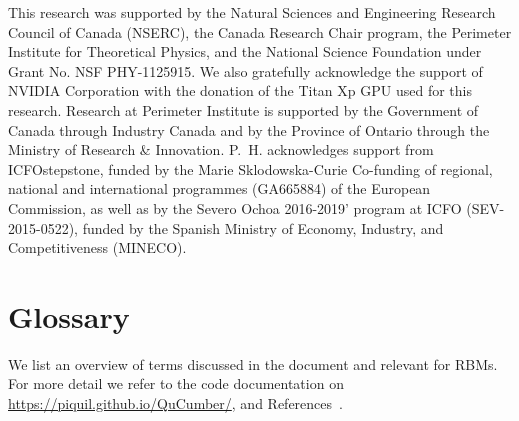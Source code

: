 \documentclass[submission, Phys, hidelnks]{SciPost}
\begin{document}
This research was supported by the Natural Sciences and Engineering
Research Council of Canada (NSERC), the
Canada Research Chair program, the Perimeter Institute
for Theoretical Physics, and the National Science Foundation
under Grant No. NSF PHY-1125915. We also gratefully
acknowledge the support of NVIDIA Corporation with
the donation of the Titan Xp GPU used for this research.
Research at Perimeter Institute is supported by the Government
of Canada through Industry Canada and by the
Province of Ontario through the Ministry of Research \&
Innovation. P.~H. acknowledges support from ICFOstepstone, funded by the Marie Sklodowska-Curie Co-funding of regional, national and international programmes (GA665884) of the European Commission, as well as by the Severo Ochoa 2016-2019' program at ICFO (SEV-2015-0522), funded by the Spanish Ministry of Economy, Industry, and Competitiveness (MINECO).


\appendix
\section{Glossary}
\label{Glossary}

We list an overview of terms discussed in the document and relevant for RBMs. For more detail we refer to the code documentation on \url{https://piquil.github.io/QuCumber/}, and References~\cite{hinton2002training, hinton2012practical}.
\end{document}
